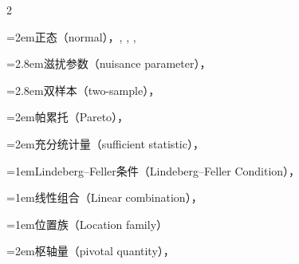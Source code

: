 \begin{multicols}{2}
\par\noindent\hangindent=2em\hspace*{1em}\label{idx:638}正态（normal），\hyperref[ex:8.2.2]{\pageref*{ex:8.2.2}}, \hyperref[ex:8.2.6]{\pageref*{ex:8.2.6}}, \hyperref[ex:8.3.7]{\pageref*{ex:8.3.7}}, \hyperref[exercise:8.37]{\pageref*{exercise:8.37}}\par
\par\noindent\hangindent=2.8em\hspace*{1.8em}\label{idx:639}滋扰参数（nuisance parameter），\hyperref[ex:8.2.6]{\pageref*{ex:8.2.6}}\par
\par\noindent\hangindent=2.8em\hspace*{1.8em}\label{idx:640}双样本（two-sample），\hyperref[exercise:8.41]{\pageref*{exercise:8.41}}\par
\par\noindent\hangindent=2em\hspace*{1em}\label{idx:641}帕累托（Pareto），\hyperref[exercise:8.5]{\pageref*{exercise:8.5}}\par
\par\noindent\hangindent=2em\hspace*{1em}\label{idx:642}充分统计量（sufficient statistic），\hyperref[thm:8.2.4]{\pageref*{thm:8.2.4}}\par
\par\addvspace{2pt}
\par\noindent\hangindent=1em\hspace*{0em}\label{idx:643}Lindeberg–Feller条件（Lindeberg–Feller Condition），\hyperref[sec:5.8.1]{\pageref*{sec:5.8.1}}\par
\par\addvspace{2pt}
\par\noindent\hangindent=1em\hspace*{0em}\label{idx:644}线性组合（Linear combination），\hyperref[def:11.2.4]{\pageref*{def:11.2.4}}\par
\par\addvspace{2pt}
\par\noindent\hangindent=1em\hspace*{0em}\label{idx:645}位置族（Location family）\par
\par\noindent\hangindent=2em\hspace*{1em}\label{idx:646}枢轴量（pivotal quantity），\hyperref[ex:9.2.7]{\pageref*{ex:9.2.7}}\par

\end{multicols}
